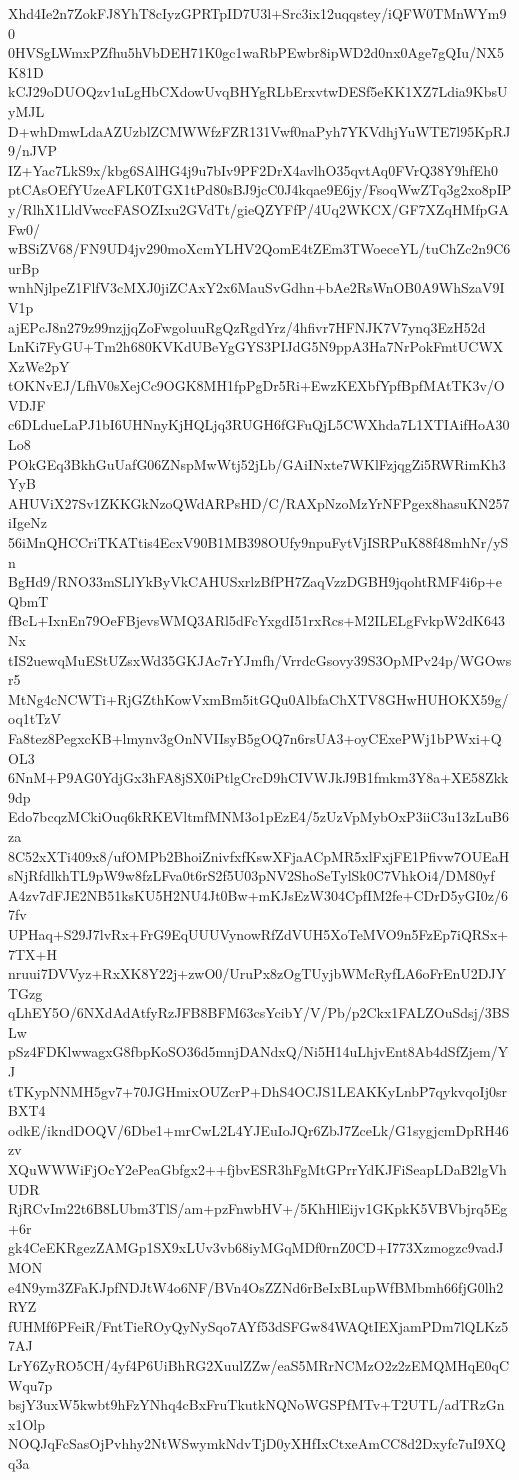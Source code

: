 Xhd4Ie2n7ZokFJ8YhT8cIyzGPRTpID7U3l+Src3ix12uqqstey/iQFW0TMnWYm90
0HVSgLWmxPZfhu5hVbDEH71K0gc1waRbPEwbr8ipWD2d0nx0Age7gQIu/NX5K81D
kCJ29oDUOQzv1uLgHbCXdowUvqBHYgRLbErxvtwDESf5eKK1XZ7Ldia9KbsUyMJL
D+whDmwLdaAZUzblZCMWWfzFZR131Vwf0naPyh7YKVdhjYuWTE7l95KpRJ9/nJVP
IZ+Yac7LkS9x/kbg6SAlHG4j9u7bIv9PF2DrX4avlhO35qvtAq0FVrQ38Y9hfEh0
ptCAsOEfYUzeAFLK0TGX1tPd80sBJ9jcC0J4kqae9E6jy/FsoqWwZTq3g2xo8pIP
y/RlhX1LldVwccFASOZIxu2GVdTt/gieQZYFfP/4Uq2WKCX/GF7XZqHMfpGAFw0/
wBSiZV68/FN9UD4jv290moXcmYLHV2QomE4tZEm3TWoeceYL/tuChZc2n9C6urBp
wnhNjlpeZ1FlfV3cMXJ0jiZCAxY2x6MauSvGdhn+bAe2RsWnOB0A9WhSzaV9IV1p
ajEPcJ8n279z99nzjjqZoFwgoluuRgQzRgdYrz/4hfivr7HFNJK7V7ynq3EzH52d
LnKi7FyGU+Tm2h680KVKdUBeYgGYS3PIJdG5N9ppA3Ha7NrPokFmtUCWXXzWe2pY
tOKNvEJ/LfhV0sXejCc9OGK8MH1fpPgDr5Ri+EwzKEXbfYpfBpfMAtTK3v/OVDJF
c6DLdueLaPJ1bI6UHNnyKjHQLjq3RUGH6fGFuQjL5CWXhda7L1XTIAifHoA30Lo8
POkGEq3BkhGuUafG06ZNspMwWtj52jLb/GAiINxte7WKlFzjqgZi5RWRimKh3YyB
AHUViX27Sv1ZKKGkNzoQWdARPsHD/C/RAXpNzoMzYrNFPgex8hasuKN257iIgeNz
56iMnQHCCriTKATtis4EcxV90B1MB398OUfy9npuFytVjISRPuK88f48mhNr/ySn
BgHd9/RNO33mSLlYkByVkCAHUSxrlzBfPH7ZaqVzzDGBH9jqohtRMF4i6p+eQbmT
fBcL+IxnEn79OeFBjevsWMQ3ARl5dFcYxgdI51rxRcs+M2ILELgFvkpW2dK643Nx
tIS2uewqMuEStUZsxWd35GKJAc7rYJmfh/VrrdcGsovy39S3OpMPv24p/WGOwsr5
MtNg4cNCWTi+RjGZthKowVxmBm5itGQu0AlbfaChXTV8GHwHUHOKX59g/oq1tTzV
Fa8tez8PegxcKB+lmynv3gOnNVIIsyB5gOQ7n6rsUA3+oyCExePWj1bPWxi+QOL3
6NnM+P9AG0YdjGx3hFA8jSX0iPtlgCrcD9hCIVWJkJ9B1fmkm3Y8a+XE58Zkk9dp
Edo7bcqzMCkiOuq6kRKEVltmfMNM3o1pEzE4/5zUzVpMybOxP3iiC3u13zLuB6za
8C52xXTi409x8/ufOMPb2BhoiZnivfxfKswXFjaACpMR5xlFxjFE1Pfivw7OUEaH
sNjRfdlkhTL9pW9w8fzLFva0t6rS2f5U03pNV2ShoSeTylSk0C7VhkOi4/DM80yf
A4zv7dFJE2NB51ksKU5H2NU4Jt0Bw+mKJsEzW304CpfIM2fe+CDrD5yGI0z/67fv
UPHaq+S29J7lvRx+FrG9EqUUUVynowRfZdVUH5XoTeMVO9n5FzEp7iQRSx+7TX+H
nruui7DVVyz+RxXK8Y22j+zwO0/UruPx8zOgTUyjbWMcRyfLA6oFrEnU2DJYTGzg
qLhEY5O/6NXdAdAtfyRzJFB8BFM63csYcibY/V/Pb/p2Ckx1FALZOuSdsj/3BSLw
pSz4FDKlwwagxG8fbpKoSO36d5mnjDANdxQ/Ni5H14uLhjvEnt8Ab4dSfZjem/YJ
tTKypNNMH5gv7+70JGHmixOUZcrP+DhS4OCJS1LEAKKyLnbP7qykvqoIj0srBXT4
odkE/ikndDOQV/6Dbe1+mrCwL2L4YJEuIoJQr6ZbJ7ZceLk/G1sygjcmDpRH46zv
XQuWWWiFjOcY2ePeaGbfgx2++fjbvESR3hFgMtGPrrYdKJFiSeapLDaB2lgVhUDR
RjRCvIm22t6B8LUbm3TlS/am+pzFnwbHV+/5KhHlEijv1GKpkK5VBVbjrq5Eg+6r
gk4CeEKRgezZAMGp1SX9xLUv3vb68iyMGqMDf0rnZ0CD+I773Xzmogzc9vadJMON
e4N9ym3ZFaKJpfNDJtW4o6NF/BVn4OsZZNd6rBeIxBLupWfBMbmh66fjG0lh2RYZ
fUHMf6PFeiR/FntTieROyQyNySqo7AYf53dSFGw84WAQtIEXjamPDm7lQLKz57AJ
LrY6ZyRO5CH/4yf4P6UiBhRG2XuulZZw/eaS5MRrNCMzO2z2zEMQMHqE0qCWqu7p
bsjY3uxW5kwbt9hFzYNhq4cBxFruTkutkNQNoWGSPfMTv+T2UTL/adTRzGnx1Olp
NOQJqFcSasOjPvhhy2NtWSwymkNdvTjD0yXHfIxCtxeAmCC8d2Dxyfc7uI9XQq3a
